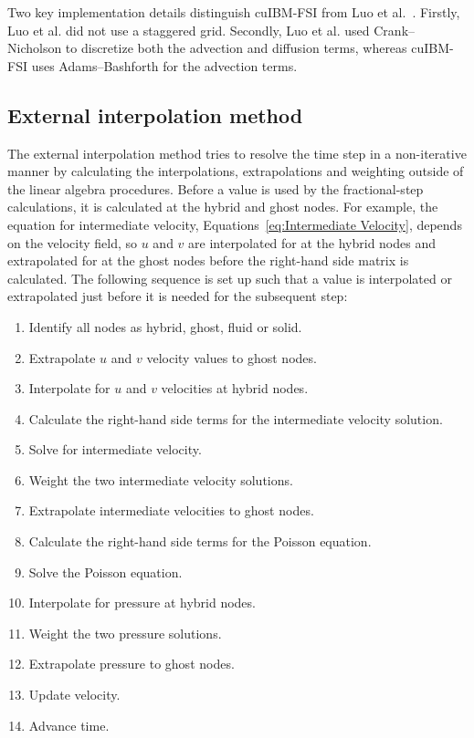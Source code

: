 Two key implementation details distinguish cuIBM-FSI from Luo et al.~\cite{Luo:2012gx}. 
Firstly, Luo et al. did not use a staggered grid. 
Secondly, Luo et al. used Crank--Nicholson to discretize both the advection and diffusion terms, whereas cuIBM-FSI uses Adams--Bashforth for the advection terms. 

\subsection{External interpolation method}
\label{sec:ID external}
The external interpolation method tries to resolve the time step in a non-iterative manner by calculating the interpolations, extrapolations and weighting outside of the linear algebra procedures. 
Before a value is used by the fractional-step calculations, it is calculated at the hybrid and ghost nodes. 
For example, the equation for intermediate velocity, Equations~\eqref{eq:Intermediate Velocity}, depends on the velocity field, so $u$ and $v$ are interpolated for at the hybrid nodes and extrapolated for at the ghost nodes before the right-hand side matrix is calculated. 
The following sequence is set up such that a value is interpolated or extrapolated just before it is needed for the subsequent step:


\begin{enumerate}
	\item Identify all nodes as hybrid, ghost, fluid or solid. 
	\item Extrapolate $u$ and $v$ velocity values to ghost nodes. 
	\item Interpolate for $u$ and $v$ velocities at hybrid nodes. 
	\item Calculate the right-hand side terms for the intermediate velocity solution. 
	\item Solve for intermediate velocity. 
	\item Weight the two intermediate velocity solutions. 
	\item Extrapolate intermediate velocities to ghost nodes. 
	\item Calculate the right-hand side terms for the Poisson equation. 
	\item Solve the Poisson equation. 
	\item Interpolate for pressure at hybrid nodes. 
	\item Weight the two pressure solutions. 
	\item Extrapolate pressure to ghost nodes. 
	\item Update velocity. 
	\item Advance time. 
\end{enumerate}

